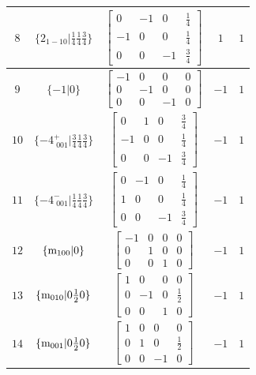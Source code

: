\documentclass[fleqn,8pt]{jsarticle}
\begin{document}
\begin{longtable}{ccccc}
$ 8 $ & $ \{2{}_{1-10}|\frac{1}{4} \frac{1}{4} \frac{3}{4}\} $ & $ \begin{bmatrix} 0 & -1 & 0 & \frac{1}{4} \\ -1 & 0 & 0 & \frac{1}{4} \\ 0 & 0 & -1 & \frac{3}{4} \end{bmatrix} $ & $ 1 $ & $ 1 $ \\ \hline
$ 9 $ & $ \{-1|0\} $ & $ \begin{bmatrix} -1 & 0 & 0 & 0 \\ 0 & -1 & 0 & 0 \\ 0 & 0 & -1 & 0 \end{bmatrix} $ & $ -1 $ & $ 1 $ \\ \hline
$ 10 $ & $ \{-4^{+}_{\,\,001}|\frac{3}{4} \frac{1}{4} \frac{3}{4}\} $ & $ \begin{bmatrix} 0 & 1 & 0 & \frac{3}{4} \\ -1 & 0 & 0 & \frac{1}{4} \\ 0 & 0 & -1 & \frac{3}{4} \end{bmatrix} $ & $ -1 $ & $ 1 $ \\ \hline
$ 11 $ & $ \{-4^{-}_{\,\,001}|\frac{1}{4} \frac{1}{4} \frac{3}{4}\} $ & $ \begin{bmatrix} 0 & -1 & 0 & \frac{1}{4} \\ 1 & 0 & 0 & \frac{1}{4} \\ 0 & 0 & -1 & \frac{3}{4} \end{bmatrix} $ & $ -1 $ & $ 1 $ \\ \hline
$ 12 $ & $ \{{\rm m}_{100}|0\} $ & $ \begin{bmatrix} -1 & 0 & 0 & 0 \\ 0 & 1 & 0 & 0 \\ 0 & 0 & 1 & 0 \end{bmatrix} $ & $ -1 $ & $ 1 $ \\ \hline
$ 13 $ & $ \{{\rm m}_{010}|0 \frac{1}{2} 0\} $ & $ \begin{bmatrix} 1 & 0 & 0 & 0 \\ 0 & -1 & 0 & \frac{1}{2} \\ 0 & 0 & 1 & 0 \end{bmatrix} $ & $ -1 $ & $ 1 $ \\ \hline
$ 14 $ & $ \{{\rm m}_{001}|0 \frac{1}{2} 0\} $ & $ \begin{bmatrix} 1 & 0 & 0 & 0 \\ 0 & 1 & 0 & \frac{1}{2} \\ 0 & 0 & -1 & 0 \end{bmatrix} $ & $ -1 $ & $ 1 $ \\ \hline

\end{longtable}
\end{document}
